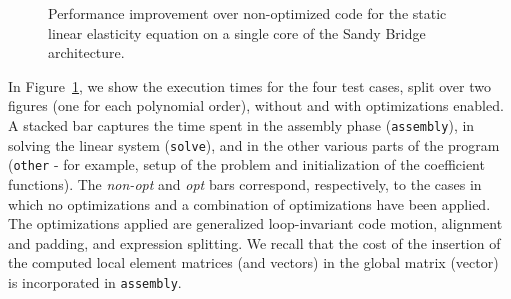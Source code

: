 \begin{figure}
	\centering
	\caption{Performance improvement over non-optimized code for the static linear elasticity equation on a single core of the Sandy Bridge architecture.}
	\label{fig:full-app-res}
\end{figure}

In Figure~\ref{fig:full-app-res}, we show the execution times for the four test cases, split over two figures (one for each polynomial order), without and with optimizations enabled. A stacked bar captures the time spent in the assembly phase (\texttt{assembly}), in solving the linear system (\texttt{solve}), and in the other various parts of the program (\texttt{other} - for example, setup of the problem and initialization of the coefficient functions). The \emph{non-opt} and \emph{opt} bars correspond, respectively, to the cases in which no optimizations and a combination of optimizations have been applied. The optimizations applied are generalized loop-invariant code motion, alignment and padding, and expression splitting. We recall that the cost of the insertion of the computed local element matrices (and vectors) in the global matrix (vector) is incorporated in \texttt{assembly}.

